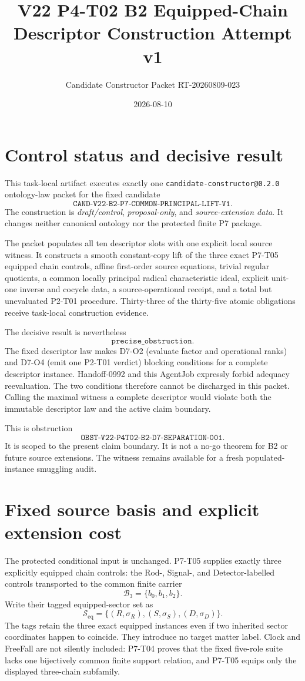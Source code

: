 \documentclass[11pt]{article}
\title{V22 P4-T02 B2 Equipped-Chain Descriptor Construction Attempt v1}
\author{Candidate Constructor Packet RT-20260809-023}
\date{2026-08-10}
\newcommand{\Sectors}{\mathcal S_{\mathrm{eq}}}
\newcommand{\Bthree}{\mathcal B_3}
\begin{document}
\maketitle

\section{Control status and decisive result}

This task-local artifact executes exactly one
\texttt{candidate-constructor@0.2.0} ontology-law packet for the fixed
candidate
\[
  \texttt{CAND-V22-B2-P7-COMMON-PRINCIPAL-LIFT-V1}.
\]
The construction is \emph{draft/control}, \emph{proposal-only}, and
\emph{source-extension data}. It changes neither canonical ontology nor the
protected finite P7 package.

The packet populates all ten descriptor slots with one explicit local source
witness. It constructs a smooth constant-copy lift of the three exact
P7-T05 equipped chain controls, affine first-order source equations, trivial
regular quotients, a common locally principal radical characteristic ideal,
explicit unit-one inverse and cocycle data, a source-operational receipt, and
a total but unevaluated P2-T01 procedure. Thirty-three of the thirty-five
atomic obligations receive task-local construction evidence.

The decisive result is nevertheless
\[
  \boxed{\texttt{precise\_obstruction}}.
\]
The fixed descriptor law makes D7-O2 (evaluate factor and operational ranks)
and D7-O4 (emit one P2-T01 verdict) blocking conditions for a complete
descriptor instance. Handoff-0992 and this AgentJob expressly forbid adequacy
reevaluation. The two conditions therefore cannot be discharged in this
packet. Calling the maximal witness a complete descriptor would violate both
the immutable descriptor law and the active claim boundary.

This is obstruction
\[
  \texttt{OBST-V22-P4T02-B2-D7-SEPARATION-001}.
\]
It is scoped to the present claim boundary. It is not a no-go theorem for B2
or future source extensions. The witness remains available for a fresh
populated-instance smuggling audit.

\section{Fixed source basis and explicit extension cost}

The protected conditional input is unchanged. P7-T05 supplies exactly three
explicitly equipped chain controls: the Rod-, Signal-, and Detector-labelled
controls transported to the common finite carrier
\[
  \Bthree=\{b_0,b_1,b_2\}.
\]
Write their tagged equipped-sector set as
\[
  \Sectors=\{(R,\sigma_R),(S,\sigma_S),(D,\sigma_D)\}.
\]
The tags retain the three exact equipped instances even if two inherited
sector coordinates happen to coincide. They introduce no target matter label.
Clock and FreeFall are not silently included: P7-T04 proves that the fixed
five-role suite lacks one bijectively common finite support relation, and
P7-T05 equips only the displayed three-chain subfamily.
\end{document}
